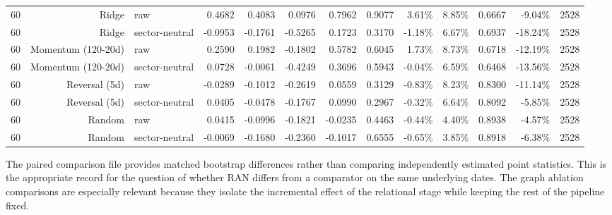 \documentclass[10pt]{article}
\begin{document}
\begin{longtable}{rrlrrrrrrrrrr}
60 & Ridge & raw & 0.4682 & 0.4083 & 0.0976 & 0.7962 & 0.9077 & 3.61\% & 8.85\% & 0.6667 & -9.04\% & 2528 \\
60 & Ridge & sector-neutral & -0.0953 & -0.1761 & -0.5265 & 0.1723 & 0.3170 & -1.18\% & 6.67\% & 0.6937 & -18.24\% & 2528 \\
60 & Momentum (120-20d) & raw & 0.2590 & 0.1982 & -0.1802 & 0.5782 & 0.6045 & 1.73\% & 8.73\% & 0.6718 & -12.19\% & 2528 \\
60 & Momentum (120-20d) & sector-neutral & 0.0728 & -0.0061 & -0.4249 & 0.3696 & 0.5943 & -0.04\% & 6.59\% & 0.6468 & -13.56\% & 2528 \\
60 & Reversal (5d) & raw & -0.0289 & -0.1012 & -0.2619 & 0.0559 & 0.3129 & -0.83\% & 8.23\% & 0.8300 & -11.14\% & 2528 \\
60 & Reversal (5d) & sector-neutral & 0.0405 & -0.0478 & -0.1767 & 0.0990 & 0.2967 & -0.32\% & 6.64\% & 0.8092 & -5.85\% & 2528 \\
60 & Random & raw & 0.0415 & -0.0996 & -0.1821 & -0.0235 & 0.4463 & -0.44\% & 4.40\% & 0.8938 & -4.57\% & 2528 \\
60 & Random & sector-neutral & -0.0069 & -0.1680 & -0.2360 & -0.1017 & 0.6555 & -0.65\% & 3.85\% & 0.8918 & -6.38\% & 2528 \\
\bottomrule
\end{longtable}
\endgroup


The paired comparison file provides matched bootstrap differences rather than comparing independently estimated point statistics. This is the appropriate record for the question of whether RAN differs from a comparator on the same underlying dates. The graph ablation comparisons are especially relevant because they isolate the incremental effect of the relational stage while keeping the rest of the pipeline fixed.
\end{document}
